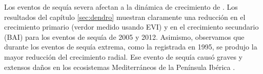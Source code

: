 Los eventos de sequía severa afectan a la dinámica de crecimiento de \Qp. Los resultados del capítulo \ref{sec:dendro} muestran claramente una reducción en el crecimiento primario (verdor medido usando EVI) y en el crecimiento secundario (BAI) para los eventos de sequía de 2005 y 2012. Asimismo, observamos que durante los eventos de sequía extrema, como la registrada en 1995, se produjo la mayor reducción del crecimiento radial. Ese evento de sequía causó graves y extensos daños en los ecosistemas Mediterráneos de la Península Ibérica \autocite{Penuelasetal2001SevereDrought,Gazoletal2018ForestResilience}.

